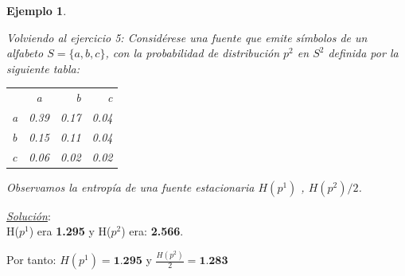 \documentclass{beamer}
\theoremstyle{plain}
\theoremstyle{example}
\theoremstyle{example}
\newtheorem{ejemplo} [Ejemplo] {Ejemplo}
\begin{document}
\begin{frame}  \footnotesize 

\begin{ejemplo}\label{ejemplo:4.7}

Volviendo al ejercicio 5: Considérese una fuente que emite símbolos de un alfabeto $S = \{a, b, c\}$, con la probabilidad de distribución $p^2$ en $S^2$ definida por la siguiente tabla:

\begin{center}
 \begin{tabular}{ l c r r}
         & a & b & c\\
   a & 0.39 & 0.17 & 0.04 \\
   b & 0.15 & 0.11 & 0.04 \\
   c & 0.06 & 0.02 & 0.02 \\
 \end{tabular}
\end{center}

Observamos la entropía de una fuente estacionaria $H(p^1)$ , $H(p^2)/2$.\\

\end{ejemplo}

\textit{\underline{Solución}}:\\
H($p^1$) era \textbf{1.295} y H($p^2$) era: \textbf{2.566}.\\
\hspace{0.5cm}

Por tanto:  $H(p^1) = \textbf{1.295}$ y $\frac{H(p^2)}{2} = \textbf{1.283}$

\end{frame} 
\end{document}
